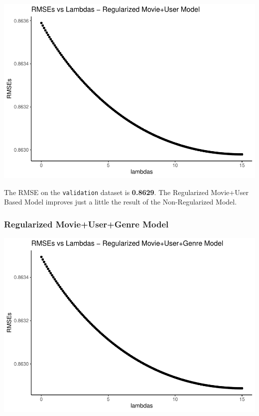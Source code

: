 \documentclass[
]{article}
\begin{document}
\begin{center}\includegraphics{MovieLens-Project-Report_files/figure-latex/unnamed-chunk-38-1} \end{center}

The RMSE on the \texttt{validation} dataset is \textbf{0.8629}. The
Regularized Movie+User Based Model improves just a little the result of
the Non-Regularized Model.

\hypertarget{regularized-movieusergenre-model}{%
\subsubsection{Regularized Movie+User+Genre
Model}\label{regularized-movieusergenre-model}}

\begin{center}\includegraphics{MovieLens-Project-Report_files/figure-latex/unnamed-chunk-39-1} \end{center}
\end{document}

